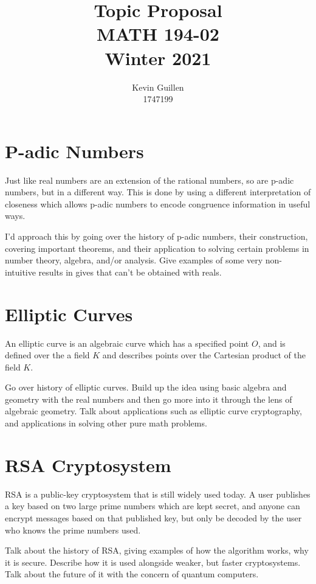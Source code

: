 \documentclass{article}
\title{Topic Proposal\\MATH 194-02\\Winter 2021}
\author{Kevin Guillen\\1747199}
\begin{document}
\maketitle

\section{P-adic Numbers}
Just like real numbers are an extension of the rational numbers, so are p-adic numbers, but in a different way. This is done by using a different interpretation of closeness which allows p-adic numbers to encode congruence information in useful ways. 

I'd approach this by going over the history of p-adic numbers, their construction, covering important theorems, and their application to solving certain problems in number theory, algebra, and/or analysis. Give examples of some very non-intuitive results in gives that can't be obtained with reals.

\section{Elliptic Curves}
An elliptic curve is an algebraic curve which has a specified point $O$, and is defined over the a field $K$ and describes points over the Cartesian product of the field $K$. 

Go over history of elliptic curves. Build up the idea using basic algebra and geometry with the real numbers and then go more into it through the lens of algebraic geometry. Talk about applications such as elliptic curve cryptography, and applications in solving other pure math problems. 

\section{RSA Cryptosystem}
RSA is a public-key cryptosystem that is still widely used today. A user publishes a key based on two large prime numbers which are kept secret, and anyone can encrypt messages based on that published key, but only be decoded by the user who knows the prime numbers used. 

Talk about the history of RSA, giving examples of how the algorithm works, why it is secure. Describe how it is used alongside weaker, but faster cryptosystems. Talk about the future of it with the concern of quantum computers. 
\end{document}
